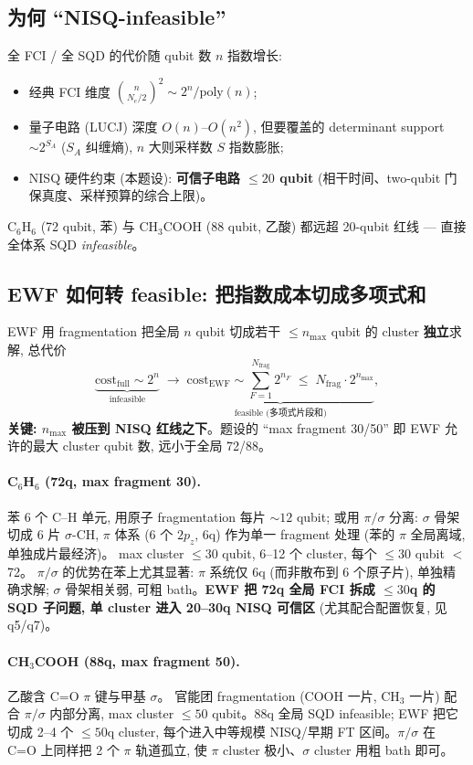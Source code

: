 \documentclass[11pt]{article}
\newcommand{\sig}{\sigma}
\begin{document}
\subsection{为何 ``NISQ-infeasible''}
全 FCI / 全 SQD 的代价随 qubit 数 $n$ 指数增长:
\begin{itemize}
  \item 经典 FCI 维度 $\binom{n}{N_e/2}^2\sim 2^n/\mathrm{poly}(n)$;
  \item 量子电路 (LUCJ) 深度 $O(n)$--$O(n^2)$, 但要覆盖的 determinant support
        $\sim 2^{S_A}$ ($S_A$ 纠缠熵), $n$ 大则采样数 $S$ 指数膨胀;
  \item NISQ 硬件约束 (本题设): \textbf{可信子电路 $\le 20$ qubit} (相干时间、two-qubit
        门保真度、采样预算的综合上限)。
\end{itemize}
C$_6$H$_6$ (72 qubit, 苯) 与 CH$_3$COOH (88 qubit, 乙酸) 都远超 20-qubit 红线 ---
直接全体系 SQD \emph{infeasible}。

\subsection{EWF 如何转 feasible: 把指数成本切成多项式和}
EWF 用 fragmentation 把全局 $n$ qubit 切成若干 $\le n_{\max}$ qubit 的 cluster
\textbf{独立}求解, 总代价
\[
  \underbrace{\text{cost}_{\text{full}}\sim 2^{n}}_{\text{infeasible}}
  \;\longrightarrow\;
  \underbrace{\text{cost}_{\text{EWF}}\sim \sum_{F=1}^{N_{\text{frag}}} 2^{n_F}
  \;\le\; N_{\text{frag}}\cdot 2^{n_{\max}}}_{\text{feasible (多项式片段和)}},
  \tag{6}
\]
\textbf{关键: $n_{\max}$ 被压到 NISQ 红线之下}。题设的 ``max fragment 30/50'' 即 EWF
允许的最大 cluster qubit 数, 远小于全局 72/88。

\paragraph{C$_6$H$_6$ (72q, max fragment 30).} 苯 6 个 C--H 单元, 用原子 fragmentation
每片 $\sim 12$ qubit; 或用 $\pi/\sig$ 分离: $\sig$ 骨架切成 6 片 $\sig$-CH, $\pi$ 体系
(6 个 $2p_z$, 6q) 作为单一 fragment 处理 (苯的 $\pi$ 全局离域, 单独成片最经济)。
max cluster $\le 30$ qubit, 6--12 个 cluster, 每个 $\le 30$ qubit $<$ 72。
$\pi/\sig$ 的优势在苯上尤其显著: $\pi$ 系统仅 6q (而非散布到 6 个原子片), 单独精确求解;
$\sig$ 骨架相关弱, 可粗 bath。\textbf{EWF 把 72q 全局 FCI 拆成 $\le30$q 的 SQD 子问题,
单 cluster 进入 20--30q NISQ 可信区} (尤其配合配置恢复, 见 q5/q7)。

\paragraph{CH$_3$COOH (88q, max fragment 50).} 乙酸含 C=O $\pi$ 键与甲基 $\sig$。
官能团 fragmentation (COOH 一片, CH$_3$ 一片) 配合 $\pi/\sig$ 内部分离, max cluster
$\le 50$ qubit。88q 全局 SQD infeasible; EWF 把它切成 2--4 个 $\le50$q cluster,
每个进入中等规模 NISQ/早期 FT 区间。$\pi/\sig$ 在 C=O 上同样把 2 个 $\pi$ 轨道孤立,
使 $\pi$ cluster 极小、$\sig$ cluster 用粗 bath 即可。
\end{document}
